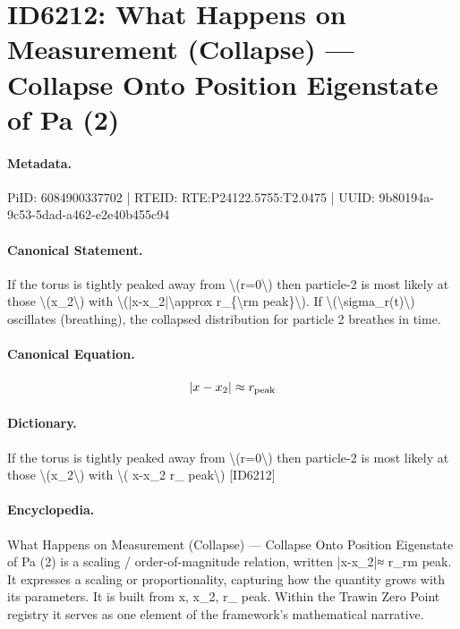 \section*{ID6212: What Happens on Measurement (Collapse) — Collapse Onto Position Eigenstate of Pa (2)}
\paragraph{Metadata.}
PiID: 6084900337702 | RTEID: RTE:P24122.5755:T2.0475 | UUID: 9b80194a-9c53-5dad-a462-e2e40b455c94

\paragraph{Canonical Statement.}
If the torus is tightly peaked away from \textbackslash{}(r=0\textbackslash{}) then particle-2 is most likely at those \textbackslash{}(x\_2\textbackslash{}) with \textbackslash{}(|x-x\_2|\textbackslash{}approx r\_\{\textbackslash{}rm peak\}\textbackslash{}). If \textbackslash{}(\textbackslash{}sigma\_r(t)\textbackslash{}) oscillates (breathing), the collapsed distribution for particle 2 breathes in time.

\paragraph{Canonical Equation.}
\[
|x-x_2|\approx r_{\rm peak}
\]

\paragraph{Dictionary.}
If the torus is tightly peaked away from \textbackslash{}(r=0\textbackslash{}) then particle-2 is most likely at those \textbackslash{}(x\_2\textbackslash{}) with \textbackslash{}( x-x\_2 r\_ peak\textbackslash{}) [ID6212]

\paragraph{Encyclopedia.}
What Happens on Measurement (Collapse) — Collapse Onto Position Eigenstate of Pa (2) is a scaling / order-of-magnitude relation, written |x-x\_2|≈ r\_rm peak. It expresses a scaling or proportionality, capturing how the quantity grows with its parameters. It is built from x, x\_2, r\_ peak. Within the Trawin Zero Point registry it serves as one element of the framework's mathematical narrative.
